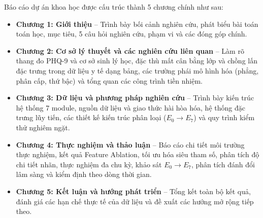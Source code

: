 Báo cáo dự án khoa học được cấu trúc thành 5 chương chính như sau:
\begin{itemize}
    \item \textbf{Chương 1: Giới thiệu} -- Trình bày bối cảnh nghiên cứu, phát biểu bài toán toán học, mục tiêu, 5 câu hỏi nghiên cứu, phạm vi và các đóng góp chính.
    \item \textbf{Chương 2: Cơ sở lý thuyết và các nghiên cứu liên quan} -- Làm rõ thang đo PHQ-9 và cơ sở sinh lý học, đặc thù mất cân bằng lớp và chồng lấn đặc trưng trong dữ liệu y tế dạng bảng, các trường phái mô hình hóa (phẳng, phân cấp, thứ bậc) và tổng quan các công trình tiền nhiệm.
    \item \textbf{Chương 3: Dữ liệu và phương pháp nghiên cứu} -- Trình bày kiến trúc hệ thống 7 module, nguồn dữ liệu và giao thức hài hòa hóa, hệ thống đặc trưng lũy tiến, các thiết kế kiến trúc phân loại ($E_0 \to E_7$) và quy trình kiểm thử nghiêm ngặt.
    \item \textbf{Chương 4: Thực nghiệm và thảo luận} -- Báo cáo chi tiết môi trường thực nghiệm, kết quả Feature Ablation, tối ưu hóa siêu tham số, phân tích độ chi tiết nhãn, thực nghiệm đa chu kỳ, khảo sát $E_0 \to E_7$, phân tích đánh đổi lâm sàng và kiểm định theo dòng thời gian.
    \item \textbf{Chương 5: Kết luận và hướng phát triển} -- Tổng kết toàn bộ kết quả, đánh giá các hạn chế thực tế của dữ liệu và đề xuất các hướng mở rộng tiếp theo.
\end{itemize}

